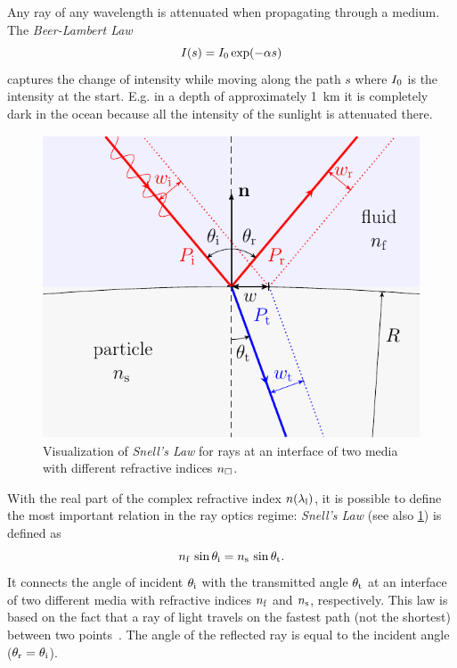 Any ray of any wavelength is attenuated when propagating through a medium. The 
\emph{Beer-Lambert Law}
\begin{equation}
  I(s) = I_{0}\exp(-\alpha s)
  \label{eq:TO-beer-lambert}
\end{equation}
captures the change of intensity while moving along the path $s$ where 
$I_{0}$ is the intensity at the start. E.g. in a depth of 
approximately \SI{1}{\kilo\meter} it is completely dark in the ocean because 
all the intensity of the sunlight is attenuated there.

\begin{figure}[tbp]
  \centering
  \includegraphics[]{Plots/cache/Snell.pdf}
  \caption{Visualization of \emph{Snell's Law} for rays at an interface of two 
  media with different refractive indices $n_{\Box}$.}
  \label{fig:TO-Snell}
\end{figure}

With the real part of the complex refractive index $n(\lambda_{\mathrm{l}})$, it is 
possible to define the most important relation in the ray optics regime: 
\emph{Snell's Law} (see also \cref{fig:TO-Snell}) is defined as
\begin{equation}
  n_{\mathrm{f}}\,\sin\theta_{\mathrm{i}} = n_{\mathrm{s}}\,\sin\theta_{\mathrm{t}}.
  \label{eq:TO-Snell}
\end{equation}
It connects the angle of incident $\theta_{\mathrm{i}}$ with the transmitted angle 
$\theta_{\mathrm{t}}$ at an interface of two different media with refractive indices 
$n_{\mathrm{f}}$ and $n_{\mathrm{s}}$, respectively. This law is based on the fact that a ray of 
light travels on the fastest path (not the shortest) between two 
points~\cite{Born1980Ch3}. The angle of the reflected ray is equal to the 
incident angle ($\theta_{\mathrm{r}}=\theta_{\mathrm{i}}$).

